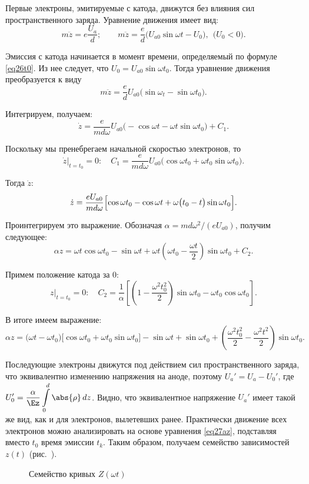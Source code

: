 
Первые электроны, эмитируемые с катода, движутся без влияния сил
пространственного заряда. Уравнение движения имеет вид:
\[
  m\ddot{z} = e\frac{U_a}{d}; \qquad
    m\ddot{z} = \frac{e}{d} \big( U_{a0}\sin\omega t - U_0 \big), \ \
    \big( U_0 < 0 \big).
\]

Эмиссия с катода начинается в момент времени, определяемый по формуле
\eqref{eq26t0}. Из нее следует, что \( U_0 = U_{a0}\sin\omega t_0 \). Тогда
уравнение движения преобразуется к виду
\[
  m\ddot{z} = \frac{e}{d}U_{a0} \bigl( \sin\omega_t - \sin\omega t_0 \big).
\]

Интегрируем, получаем:
\[
  \dot{z} = \frac{e}{md\omega}U_{a0} \big( -\cos\omega t -
    \omega t\sin\omega t_0 \big) + C_1.
\]

Поскольку мы пренебрегаем начальной скоростью электронов, то
\[
  \dot{z}\Big|_{t = t_0} = 0\colon \quad
    C_1 = \frac{e}{md\omega}U_{a0} \bigl(\cos\omega t_0 +
    \omega t_0\sin\omega t_0\big).
\]

Тогда \( \dot{z} \):
\[
  \dot{z} = \frac{eU_{a0}}{md\omega}\Bigl[ \cos\omega t_0 - \cos\omega t +
    \omega \big( t_0 - t \big) \sin\omega t_0 \Big].
\]

Проинтегрируем это выражение. Обозначая \( \alpha = md\omega^2 / (eU_{a0}) \),
получим следующее:
\[
  \alpha z = \omega t\cos\omega t_0 - \sin\omega t + \omega t \left( \omega t_0
    - \frac{\omega t}{2} \right) \sin\omega t_0 + C_2.
\]

Примем положение катода за 0:
\[
  z\Big|_{t = t_0} = 0\colon \quad
    C_2 = \frac{1}{\alpha} \left[ \left( 1 - \frac{\omega^2 t_0^2}{2} \right)
    \sin\omega t_0 - \omega t_0 \cos\omega t_0 \right].
\]

В итоге имеем выражение:
\begin{equation}
  \alpha z = \bigl( \omega t - \omega t_0 \big)\bigl[ \cos\omega t_0 +
    \omega t_0 \sin\omega t_0 \big] - \sin\omega t + \sin\omega t_0 + \left(
    \frac{\omega^2 t_0^2}{2} - \frac{\omega^2 t^2}{2} \right) \sin\omega t_0.
  \label{eq27az}
\end{equation}

Последующие электроны движутся под действием сил пространственного заряда, что
эквивалентно изменению напряжения на аноде, поэтому \( U_a' = U_a - U_0' \), где
\( \displaystyle
  U_0' = \frac{\alpha}{\Ez} \int\limits_0^d \abs{\rho}\,dz
\).
Видно, что эквивалентное напряжение \( U_a' \) имеет такой же вид, как и для
электронов, вылетевших ранее. Практически движение всех электронов можно
анализировать на основе уравнения \eqref{eq27az}, подставляя вместо \( t_0 \)
время эмиссии \( t_k \). Таким образом, получаем семейство зависимостей
\( z(t) \) (рис.~\pic{27Z(wt)}).
\begin{figure}[h!]
  \center
  \caption{Семейство кривых \( Z(\omega t) \)}
  \label{pic27Z(wt)}
\end{figure}

